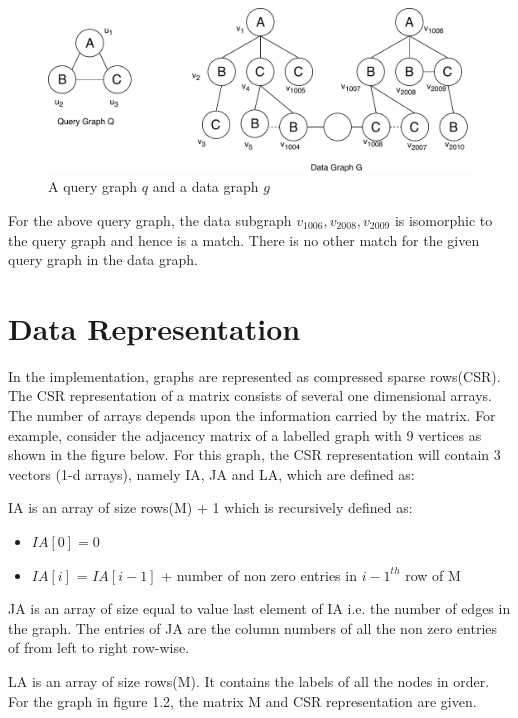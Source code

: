 \begin{figure}[h]
\centering 
\includegraphics[width=\columnwidth]{images/graph.pdf}
\caption[Subgraph Isomorphism]{A query graph $q$ and a data graph $g$} %
\label{fig:gallery} 
\end{figure}

For the above query graph, the data subgraph {$v_{1006}, v_{2008}, v_{2009}$} is isomorphic to the query graph and hence is a match. There is no other match for the given query graph in the data graph.

\section{Data Representation}

In the implementation, graphs are represented as compressed sparse rows(CSR). The CSR representation of a matrix consists of several one dimensional arrays. The number of arrays depends upon the information carried by the matrix. For example, consider the adjacency matrix of a labelled graph with 9 vertices as shown in the figure below. For this graph, the CSR representation will contain 3 vectors (1-d arrays), namely IA, JA and LA, which are defined as:

IA is an array of size rows(M) + 1 which is recursively defined as:
\begin{itemize}
    \item $IA[0] = 0$
    \item $IA[i]$ = $IA[i - 1]$ + number of non zero entries in $i - 1^{th}$ row of M
\end{itemize}

JA is an array of size equal to value last element of IA i.e. the number of edges in the graph. The entries of JA are the column numbers of all the non zero entries of from left to right row-wise.

LA is an array of size rows(M). It contains the labels of all the nodes in order. For the graph in figure 1.2, the matrix M and CSR representation are given.

